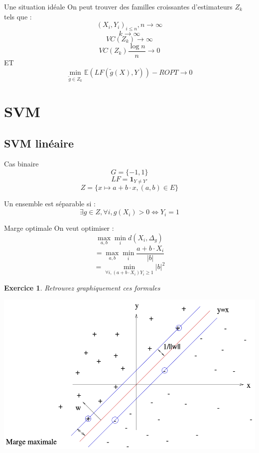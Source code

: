 \documentclass[11pt]{beamer}
\newtheorem{exercice}{Exercice}
\begin{document}
\begin{frame}{Une situation idéale}
On peut trouver des familles croissantes d'estimateurs $Z_k$ tels que :
$$(X_i,Y_i)_{i\leq n},n\rightarrow \infty $$
$$k \longrightarrow \infty$$
$$VC(Z_k) \rightarrow \infty$$
$$VC(Z_k)\frac{\log n}{n} \longrightarrow 0$$
ET\\

\vspace{0.2cm}
$$\min_{\tilde{g}\in Z_k}\mathbb{E}(LF(\tilde{g}(X),Y))- ROPT \longrightarrow 0$$

\end{frame}

\section{SVM}

\subsection{SVM linéaire}

\begin{frame}{Cas binaire}
$$G=\{-1,1\}$$
$$LF = \textbf{1}_{Y\neq Y'}$$
$$Z = \{x\mapsto a+b\cdot x,(a,b)\in E\}$$

Un ensemble est séparable si :
$$\exists g \in Z,\forall i, g(X_i)>0 \Leftrightarrow Y_i=1$$

\end{frame}

\begin{frame}{Marge optimale}
On veut optimiser :
$$\max_{a,b}\min_{i} d(X_i,\Delta_g)$$
$$= \max_{a,b}\min_{i} \frac{a+b\cdot X_i}{|b|}$$
$$= \min_{\forall i, (a+b\cdot X_i)Y_i \geq 1} |b|^2$$
\end{frame}

\begin{frame}
\begin{exercice}
Retrouvez graphiquement ces formules
\end{exercice}
\end{frame}

\begin{frame}
\includegraphics[scale=0.3]{svm}
\end{frame}
\end{document}
